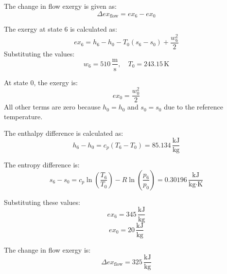 The change in flow exergy is given as:  
\[
\Delta ex_{\text{flow}} = ex_6 - ex_0
\]  

The exergy at state 6 is calculated as:  
\[
ex_6 = h_6 - h_0 - T_0 (s_6 - s_0) + \frac{w_6^2}{2}
\]  
Substituting the values:  
\[
w_6 = 510 \, \frac{\text{m}}{\text{s}}, \quad T_0 = 243.15 \, \text{K}
\]  

At state 0, the exergy is:  
\[
ex_0 = \frac{w_0^2}{2}
\]  
All other terms are zero because \( h_0 = h_0 \) and \( s_0 = s_0 \) due to the reference temperature.  

The enthalpy difference is calculated as:  
\[
h_6 - h_0 = c_p (T_6 - T_0) = 85.134 \, \frac{\text{kJ}}{\text{kg}}
\]  

The entropy difference is:  
\[
s_6 - s_0 = c_p \ln \left( \frac{T_6}{T_0} \right) - R \ln \left( \frac{p_6}{p_0} \right) = 0.30196 \, \frac{\text{kJ}}{\text{kg·K}}
\]  

Substituting these values:  
\[
ex_6 = 345 \, \frac{\text{kJ}}{\text{kg}}
\]  
\[
ex_0 = 20 \, \frac{\text{kJ}}{\text{kg}}
\]  

The change in flow exergy is:  
\[
\Delta ex_{\text{flow}} = 325 \, \frac{\text{kJ}}{\text{kg}}
\]